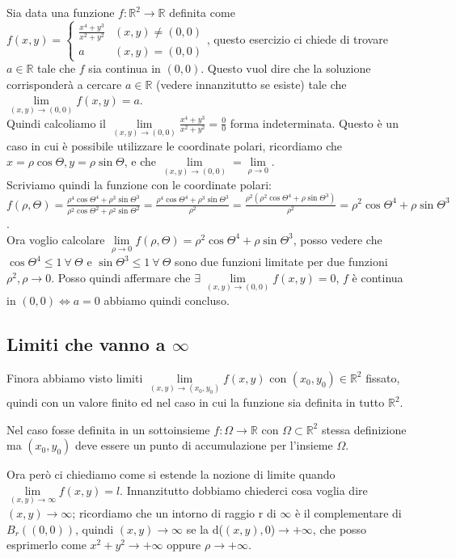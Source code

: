 \begin{example}
Sia data una funzione $f: \mathbb{R}^2 \to \mathbb{R}$ definita come $f(x,y) = \begin{cases}\frac{x^4 + y^3}{x^2 + y^2} & (x,y) \neq (0,0)\\ a & (x,y) = (0,0)\end{cases}$, questo esercizio ci chiede di trovare $a \in \mathbb{R}$ tale che $f$ sia continua in $(0,0)$. Questo vuol dire che la soluzione corrisponderà a cercare $a \in \mathbb{R}$ (vedere innanzitutto se esiste) tale che $\lim\limits_{(x,y)\to (0,0)}f(x,y) = a$.\\
Quindi calcoliamo il $\lim\limits_{(x,y)\to (0,0)}\frac{x^4 + y^3}{x^2 + y^2} = \frac{0}{0}$ forma indeterminata. Questo è un caso in cui è possibile utilizzare le coordinate polari, ricordiamo che $x = \rho \cos{\Theta}, y = \rho \sin{\Theta}$, e che $\lim\limits_{(x,y)\to (0,0)} = \lim\limits_{\rho\to 0}$. \\
Scriviamo quindi la funzione con le coordinate polari: $f(\rho,\Theta) = \frac{\rho^4\cos{\Theta}^4 + \rho^3\sin{\Theta}^3}{\rho^2\cos{\Theta}^2 + \rho^2\sin{\Theta}^2} = \frac{\rho^4\cos{\Theta}^4 + \rho^3\sin{\Theta}^3}{\rho^2} = \frac{\rho^2(\rho^2\cos{\Theta}^4 + \rho\sin{\Theta}^3)}{\rho^2} = \rho^2\cos{\Theta}^4 + \rho\sin{\Theta}^3$.\\
Ora voglio calcolare $\lim\limits_{\rho \to 0}f(\rho, \Theta) = \rho^2\cos{\Theta}^4 + \rho\sin{\Theta}^3$, posso vedere che $\cos{\Theta}^4 \leq 1 \:\forall \:\Theta$ e $\sin{\Theta}^3 \leq 1 \:\forall \:\Theta$ sono due funzioni limitate per due funzioni $\rho^2, \rho \to 0$. Posso quindi affermare che $\exists\: \lim\limits_{(x,y)\to (0,0)}f(x,y) = 0$, $f$ è continua in $(0,0) \Longleftrightarrow a = 0$ abbiamo quindi concluso.
\end{example}

\subsection{Limiti che vanno a $\infty$}
Finora abbiamo visto limiti $\lim\limits_{(x,y)\to(x_0,y_0)}f(x,y)$ con $(x_0,y_0)\in \mathbb{R}^2$ fissato, quindi con un valore finito ed nel caso in cui la funzione sia definita in tutto $\mathbb{R}^2$.
\begin{observation}
Nel caso fosse definita in un sottoinsieme $f: \Omega \to \mathbb{R}$ con $\Omega \subset \mathbb{R}^2$ stessa definizione ma $(x_0,y_0)$ deve essere un punto di accumulazione per l'insieme $\Omega$.
\end{observation}
\hspace{-15pt}Ora però ci chiediamo come si estende la nozione di limite quando $\lim\limits_{(x,y)\to \infty}f(x,y) = l$. Innanzitutto dobbiamo chiederci cosa voglia dire $(x,y)\to \infty$; ricordiamo che un intorno di raggio r di $\infty$ è il complementare di $B_r((0,0))$, quindi $(x,y)\to \infty$ se la d($(x,y),0$)$\to +\infty$, che posso esprimerlo come $x^2 + y^2 \to +\infty$ oppure $\rho \to +\infty$.

